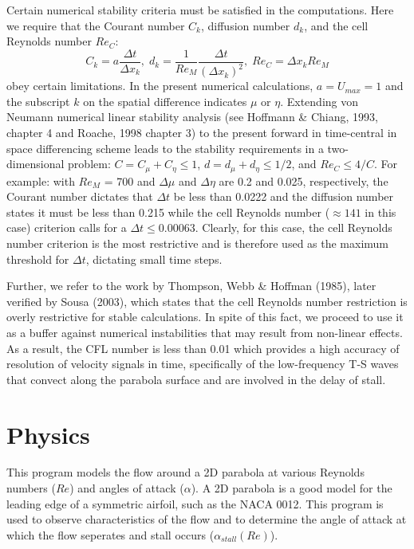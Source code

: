 \documentclass{article}
\begin{document}
Certain numerical stability criteria must be satisfied in the computations. Here we require that the Courant number $C_k$, diffusion number $d_k$, and the cell Reynolds number $Re_C$:
\begin{equation}
\label{eq:12}
C_k = a \frac{\Delta t}{\Delta x_k}, \; d_k = \frac{1}{Re_M} \frac{\Delta t}{(\Delta x_k)^2}, \; Re_C = \Delta x_k Re_M
\end{equation}
obey certain limitations. In the present numerical calculations, $a = U_{max} = 1$ and the subscript $k$ on the spatial difference indicates $\mu$ or $\eta$. Extending von Neumann numerical linear stability analysis (see Hoffmann \& Chiang, 1993, chapter 4 and Roache, 1998 chapter 3) to the present forward in time-central in space differencing scheme leads to the stability requirements in a two- dimensional problem: $C = C_\mu+C_\eta \le 1$, $d = d_\mu+d_\eta \le 1/2$, and $Re_C \le 4/C$. For example: with $Re_M$ = 700 and $\Delta \mu$ and $\Delta \eta$ are 0.2 and 0.025, respectively, the Courant number dictates that $\Delta t$ be less than 0.0222 and the diffusion number states it must be less than 0.215 while the cell Reynolds number ($\approx 141$ in this case) criterion calls for a $\Delta t \le 0.00063$. Clearly, for this case, the cell Reynolds number criterion is the most restrictive and is therefore used as the maximum threshold for $\Delta t$, dictating small time steps.

Further, we refer to the work by Thompson, Webb \& Hoffman (1985), later verified by Sousa (2003), which states that the cell Reynolds number restriction is overly restrictive for stable calculations. In spite of this fact, we proceed to use it as a buffer against numerical instabilities that may result from non-linear effects. As a result, the CFL number is less than 0.01 which provides a high accuracy of resolution of velocity signals in time, specifically of the low-frequency T-S waves that convect along the parabola surface and are involved in the delay of stall.

\section{Physics}

This program models the flow around a 2D parabola at various Reynolds numbers ($Re$) and angles of attack ($\alpha$). A 2D parabola is a good model for the leading edge of a symmetric airfoil, such as the NACA 0012. This program is used to observe characteristics of the flow and to determine the angle of attack at which the flow seperates and stall occurs ($\alpha_{stall}(Re)$).
\end{document}
